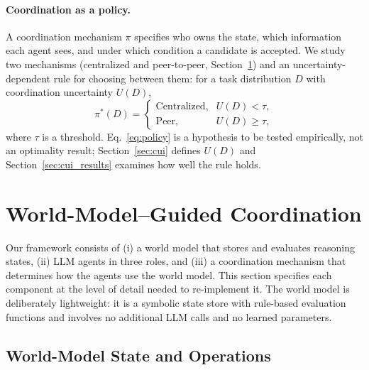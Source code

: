\paragraph{Coordination as a policy.}
A coordination mechanism \(\pi\) specifies who owns the state, which information each agent sees, and under which condition a candidate is accepted.
We study two mechanisms (centralized and peer-to-peer, Section~\ref{sec:method}) and an uncertainty-dependent rule for choosing between them: for a task distribution \(D\) with coordination uncertainty \(U(D)\),
\begin{equation}
\label{eq:policy}
\pi^{*}(D) =
\begin{cases}
\text{Centralized}, & U(D) < \tau,\\
\text{Peer}, & U(D) \ge \tau,
\end{cases}
\end{equation}
where \(\tau\) is a threshold.
Eq.~\eqref{eq:policy} is a hypothesis to be tested empirically, not an optimality result; Section~\ref{sec:cui} defines \(U(D)\) and Section~\ref{sec:cui_results} examines how well the rule holds.

\section{World-Model--Guided Coordination}
\label{sec:method}

Our framework consists of (i) a world model that stores and evaluates reasoning states, (ii) LLM agents in three roles, and (iii) a coordination mechanism that determines how the agents use the world model.
This section specifies each component at the level of detail needed to re-implement it.
The world model is deliberately lightweight: it is a symbolic state store with rule-based evaluation functions and involves no additional LLM calls and no learned parameters.

\subsection{World-Model State and Operations}
\label{sec:wm}


